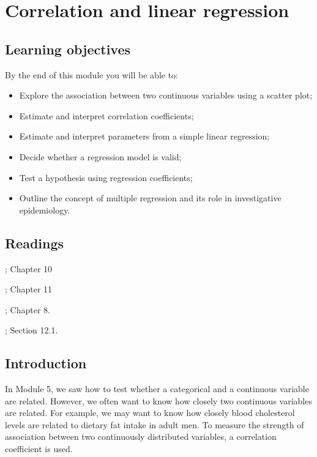 \documentclass[
]{memoir}
\providecommand{\tightlist}{%
  \setlength{\itemsep}{0pt}\setlength{\parskip}{0pt}}
\begin{document}
\hypertarget{correlation-and-linear-regression}{%
\chapter{Correlation and linear regression}\label{correlation-and-linear-regression}}

\hypertarget{learning-objectives-7}{%
\section*{Learning objectives}\label{learning-objectives-7}}

By the end of this module you will be able to:

\begin{itemize}
\tightlist
\item
  Explore the association between two continuous variables using a scatter plot;
\item
  Estimate and interpret correlation coefficients;
\item
  Estimate and interpret parameters from a simple linear regression;
\item
  Decide whether a regression model is valid;
\item
  Test a hypothesis using regression coefficients;
\item
  Outline the concept of multiple regression and its role in investigative epidemiology.
\end{itemize}

\hypertarget{readings-7}{%
\section*{Readings}\label{readings-7}}

\citep{kirkwood_sterne01}; Chapter 10

\citep{bland15}; Chapter 11

\citep{acock10}; Chapter 8.

\citep{juul_frydenberg14}; Section 12.1.

\hypertarget{introduction-5}{%
\section{Introduction}\label{introduction-5}}

In Module 5, we saw how to test whether a categorical and a continuous variable are related. However, we often want to know how closely two continuous variables are related. For example, we may want to know how closely blood cholesterol levels are related to dietary fat intake in adult men. To measure the strength of association between two continuously distributed variables, a correlation coefficient is used.
\end{document}
